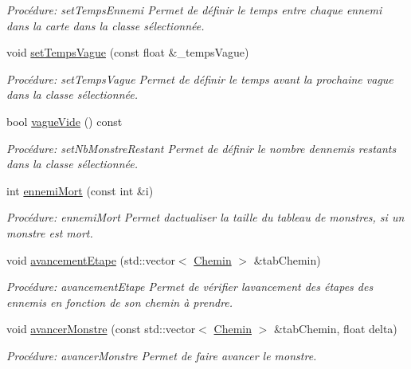 \begin{DoxyCompactItemize}
\begin{DoxyCompactList}\small\item\em Procédure\+: set\+Temps\+Ennemi Permet de définir le temps entre chaque ennemi dans la carte dans la classe sélectionnée. \end{DoxyCompactList}\item 
void \hyperlink{classVague_a3c9775c8351b1581afba79c0fd87171a}{set\+Temps\+Vague} (const float \&\+\_\+temps\+Vague)
\begin{DoxyCompactList}\small\item\em Procédure\+: set\+Temps\+Vague Permet de définir le temps avant la prochaine vague dans la classe sélectionnée. \end{DoxyCompactList}\item 
bool \hyperlink{classVague_aaa31d3deb82c73be899c478a55a6724f}{vague\+Vide} () const
\begin{DoxyCompactList}\small\item\em Procédure\+: set\+Nb\+Monstre\+Restant Permet de définir le nombre d\textquotesingle{}ennemis restants dans la classe sélectionnée. \end{DoxyCompactList}\item 
int \hyperlink{classVague_ad732fb032c4b02416946736b1e25dcc8}{ennemi\+Mort} (const int \&i)
\begin{DoxyCompactList}\small\item\em Procédure\+: ennemi\+Mort Permet d\textquotesingle{}actualiser la taille du tableau de monstres, si un monstre est mort. \end{DoxyCompactList}\item 
void \hyperlink{classVague_ab61cff7242c22ec90c6cb4858b5a0bc6}{avancement\+Etape} (std\+::vector$<$ \hyperlink{classChemin}{Chemin} $>$ \&tab\+Chemin)
\begin{DoxyCompactList}\small\item\em Procédure\+: avancement\+Etape Permet de vérifier l\textquotesingle{}avancement des étapes des ennemis en fonction de son chemin à prendre. \end{DoxyCompactList}\item 
void \hyperlink{classVague_a2a81df1228dfa2ad84109612ef378d4c}{avancer\+Monstre} (const std\+::vector$<$ \hyperlink{classChemin}{Chemin} $>$ \&tab\+Chemin, float delta)
\begin{DoxyCompactList}\small\item\em Procédure\+: avancer\+Monstre Permet de faire avancer le monstre. \end{DoxyCompactList}\item 

\end{DoxyCompactItemize}
